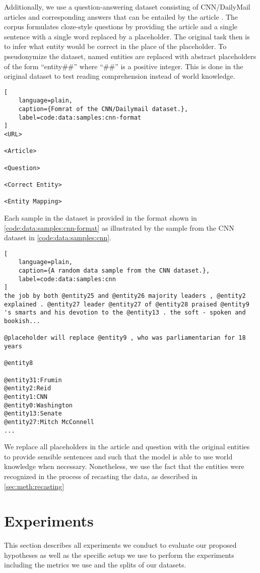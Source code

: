 Additionally, we use a question-answering dataset consisting of CNN/DailyMail articles and corresponding answers that can be entailed by the article \cite{cnn1}. The corpus formulates cloze-style questions by providing the article and a single sentence with a single word replaced by a placeholder. The original task then is to infer what entity would be correct in the place of the placeholder. To pseudonymize the dataset, named entities are replaced with abstract placeholders of the form \enquote{entity\#\#} where \enquote{\#\#} is a positive integer. This is done in the original dataset to test reading comprehension instead of world knowledge.
\begin{lstlisting}[
    language=plain,
    caption={Fomrat of the CNN/Dailymail dataset.},
    label=code:data:samples:cnn-format
]
<URL>

<Article>

<Question>

<Correct Entity>

<Entity Mapping>
\end{lstlisting}

Each sample in the dataset is provided in the format shown in \autoref{code:data:samples:cnn-format} as illustrated by the sample from the CNN dataset in \autoref{code:data:samples:cnn}.

\begin{lstlisting}[
    language=plain,
    caption={A random data sample from the CNN dataset.},
    label=code:data:samples:cnn
]
the job by both @entity25 and @entity26 majority leaders , @entity2 explained . @entity27 leader @entity27 of @entity28 praised @entity9 's smarts and his devotion to the @entity13 . the soft - spoken and bookish...

@placeholder will replace @entity9 , who was parliamentarian for 18 years

@entity8

@entity31:Frumin
@entity2:Reid
@entity1:CNN
@entity0:Washington
@entity13:Senate
@entity27:Mitch McConnell
...
\end{lstlisting}

We replace all placeholders in the article and question with the original entities to provide sensible sentences and such that the model is able to use world knowledge when necessary. Nonetheless, we use the fact that the entities were recognized in the process of recasting the data, as described in \autoref{sec:meth:recasting}

\section{Experiments} \label{sec:experiments}
This section describes all experiments we conduct to evaluate our proposed hypotheses as well as the specific setup we use to perform the experiments including the metrics we use and the splits of our datasets.

